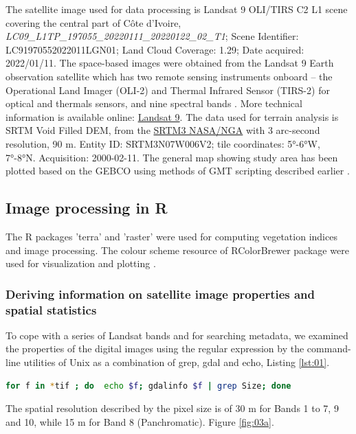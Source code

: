 \documentclass[ijgi,article,submit,pdftex,moreauthors]{Definitions/mdpi}
\begin{document}
The satellite image used for data processing is Landsat 9 OLI/TIRS C2 L1 scene covering the central part of Côte d'Ivoire, \emph{LC09\_L1TP\_197055\_20220111\_20220122\_02\_T1}; Scene Identifier: LC91970552022011LGN01; Land Cloud Coverage: 1.29; Date acquired: 2022/01/11. The space-based images were obtained from the Landsat 9 Earth observation satellite which has two remote sensing instruments onboard -- the Operational Land Imager (OLI-2) and Thermal Infrared Sensor (TIRS-2) for optical and thermals sensors, and nine spectral bands \cite{USGS,Landsat9}. More technical information is available online: \href{https://www.usgs.gov/landsat-missions/landsat-9}{Landsat 9}. The data used for terrain analysis is SRTM Void Filled DEM, from the \href{https://lpdaac.usgs.gov/products/srtmgl3v003/}{SRTM3 NASA/NGA} with 3 arc-second resolution, 90 m. Entity ID: SRTM3N07W006V2; tile coordinates: 5°-6°W, 7°-8°N. Acquisition: 2000-02-11. The general map showing study area has been plotted based on the GEBCO \cite{GEBCO} using methods of GMT scripting \cite{Wessel} described earlier \cite{Lemenkova2022b,Lemenkova202217}. 

\subsection{Image processing in R}
The R packages 'terra' \cite{RTerra} and 'raster' \cite{Hijmans} were used for computing vegetation indices and image processing. The colour scheme resource of RColorBrewer package were used for visualization and plotting \cite{Neuwirth}.

\subsubsection{Deriving information on satellite image properties and spatial statistics}
To cope with a series of Landsat bands and for searching metadata, we examined the properties of the digital images using the regular expression by the command-line utilities of Unix as a combination of grep, gdal and echo, Listing \ref{lst:01}. 

\begin{lstlisting}[language=bash, caption=Unix shell script by GDAL and echo-grep utilities to inspect the geometry of Landsat TIFs, label={lst:01}]
for f in *tif ; do  echo $f; gdalinfo $f | grep Size; done

\end{lstlisting}The spatial resolution described by the pixel size is of 30 m for Bands 1 to 7, 9 and 10, while 15 m for Band 8 (Panchromatic). Figure \ref{fig:03a}. 
\end{document}
